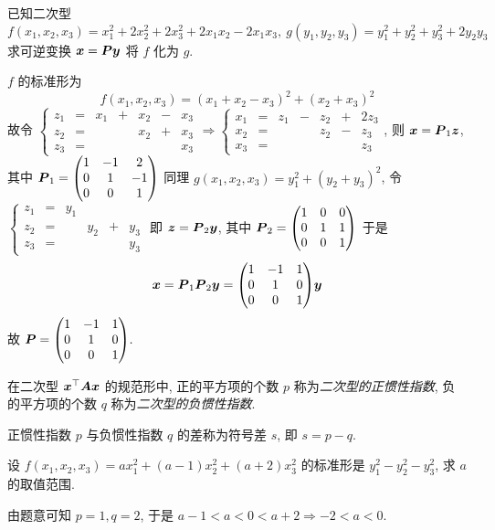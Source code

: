 \begin{example}
    已知二次型 \label{fx1x2x3gy1y2y3}$$f(x_1,x_2,x_3)=x_1^2+2x_2^2+2x_3^2+2x_1x_2-2x_1x_3,~g(y_1,y_2,y_3)=y_1^2+y_2^2+y_3^2+2y_2y_3$$
    求可逆变换 $\vb*{x}=\vb*{Py}$ 将 $f$ 化为 $g.$
\end{example}
\begin{solution}
    $f$ 的标准形为 $$f(x_1,x_2,x_3)=(x_1+x_2-x_3)^2+(x_2+x_3)^2$$
    故令 $\left\{\begin{matrix}
            z_1 & = & x_1 & + & x_2 & - & x_3 \\
            z_2 & = &     &   & x_2 & + & x_3 \\
            z_3 & = &     &   &     &   & x_3
        \end{matrix}\right.\Rightarrow \left\{\begin{matrix}
            x_1 & = & z_1 & - & z_2 & + & 2z_3 \\
            x_2 & = &     &   & z_2 & - & z_3  \\
            x_3 & = &     &   &     &   & z_3
        \end{matrix}\right.$, 则 $\vb*{x}=\vb*{P}_1\vb*{z}$, 其中 $\vb*{P}_1=\mqty(1&-1&2\\0&1&-1\\0&0&1)$
    同理 $g(x_1,x_2,x_3)=y_1^2+(y_2+y_3)^2$, 令 $\left\{\begin{matrix}
            z_1 & = & y_1                 \\
            z_2 & = &     & y_2 & + & y_3 \\
            z_3 & = &     &     &   & y_3
        \end{matrix}\right.$ 即 $\vb*{z}=\vb*{P}_2\vb*{y}$, 其中 $\vb*{P}_2=\mqty(1&0&0\\0&1&1\\0&0&1)$
    于是 $$\vb*{x}=\vb*{P}_1\vb*{P}_2\vb*{y}=\mqty(1&-1&1\\0&1&0\\0&0&1)\vb*{y}$$
    故 $\vb*{P}=\mqty(1&-1&1\\0&1&0\\0&0&1).$
\end{solution}

\begin{definition}[正负惯性指数]
    在二次型 $ \vb*{x}^{\top} \vb*{A} \vb*{x} $ 的规范形中, 正的平方项的个数 $ p $ 称为\textit{二次型的正惯性指数}, 负的平方项的个数 $ q $ 称为\textit{二次型的负惯性指数}.
\end{definition}

\begin{definition}[符号差]
    正惯性指数 $p$ 与负惯性指数 $q$ 的差称为符号差 $s$, 即 $s=p-q.$
\end{definition}
\begin{example}
    设 $f(x_1,x_2,x_3)=ax_1^2+(a-1)x_2^2+(a+2)x_3^2$ 的标准形是 $y_1^2-y_2^2-y_3^2$, 求 $a$ 的取值范围.
\end{example}
\begin{solution}
    由题意可知 $p=1,q=2$, 于是 $a-1<a<0<a+2\Rightarrow -2<a<0.$
\end{solution}


